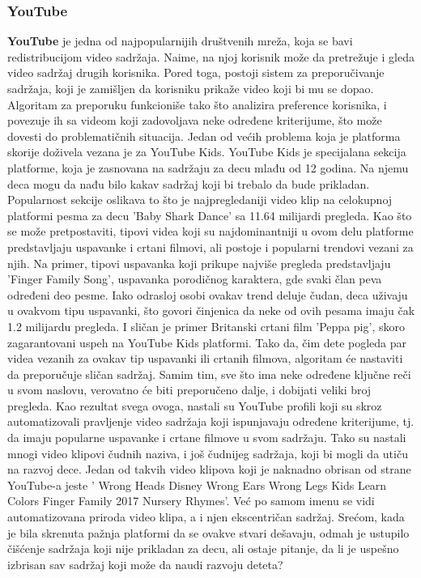 \documentclass[a4paper]{article}
\begin{document}
{\subsubsection{YouTube}
\textbf{YouTube} je jedna od najpopularnijih društvenih mreža, koja se bavi redistribucijom video sadržaja. Naime, na njoj korisnik može da pretrežuje i gleda video sadržaj drugih korisnika. Pored toga, postoji sistem za preporučivanje sadržaja, koji je zamišljen da korisniku prikaže video koji bi mu se dopao. Algoritam za preporuku funkcioniše tako što analizira preference korisnika, i povezuje ih sa videom koji zadovoljava neke određene kriterijume, što može dovesti do problematičnih situacija.  
\newline
Jedan od većih problema koja je platforma skorije doživela vezana je za YouTube Kids. YouTube Kids je specijalana sekcija platforme, koja je zasnovana na sadržaju za decu mlađu od 12 godina. Na njemu deca mogu da nađu bilo kakav sadržaj koji bi trebalo da bude prikladan. Popularnost sekcije oslikava to što je najpregledaniji video klip na celokupnoj platformi pesma za decu 'Baby Shark Dance' sa 11.64 milijardi pregleda. Kao što se može pretpostaviti, tipovi videa koji su najdominantniji u ovom delu platforme predstavljaju uspavanke i crtani filmovi, ali postoje i popularni trendovi vezani za njih. %
\newline
Na primer, tipovi uspavanka koji prikupe najviše pregleda predstavljaju 'Finger Family Song', uspavanka porodičnog karaktera, gde svaki član peva određeni deo pesme. Iako odrasloj osobi ovakav trend deluje čudan, deca uživaju u ovakvom tipu uspavanki, što govori činjenica da neke od ovih pesama imaju čak 1.2 milijardu pregleda. I sličan je primer Britanski crtani film 'Peppa pig', skoro zagarantovani uspeh na YouTube Kids platformi. Tako da, čim dete pogleda par videa
vezanih za ovakav tip uspavanki ili crtanih filmova, algoritam će nastaviti da preporučuje sličan sadržaj. Samim tim, sve što ima neke određene ključne reči u svom naslovu, verovatno će biti preporučeno dalje, i dobijati veliki broj pregleda. Kao rezultat svega ovoga, nastali su YouTube profili koji su skroz automatizovali pravljenje video sadržaja koji ispunjavaju određene kriterijume, tj. da imaju popularne uspavanke i crtane filmove u svom sadržaju. Tako su nastali mnogi video klipovi čudnih naziva, i još čudnijeg sadržaja, koji bi mogli da utiču na razvoj dece. Jedan od takvih video klipova koji je naknadno obrisan od strane YouTube-a jeste ' Wrong Heads Disney Wrong Ears Wrong Legs Kids Learn Colors Finger Family 2017 Nursery Rhymes'. Već po samom imenu se vidi automatizovana priroda video klipa, a i njen ekscentričan sadržaj.
Srećom, kada je bila skrenuta pažnja platformi da se ovakve stvari dešavaju, odmah je ustupilo čišćenje sadržaja koji nije prikladan za decu, ali ostaje pitanje, da li je uspešno izbrisan sav sadržaj koji može da naudi razvoju deteta? %
}
\end{document}
